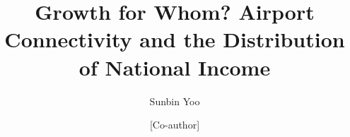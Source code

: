\makeatletter
\long{}
\makeatother
{}

\newcommand{\sym}[1]{\ensuremath{^{#1}}}



\begin{frontmatter}

\title{Growth for Whom? Airport Connectivity and the Distribution of National Income}

\author[a]{Sunbin Yoo}
\ead{[email]}
\author[a]{[Co-author]}
\address[a]{[Affiliation]}


\end{frontmatter}
